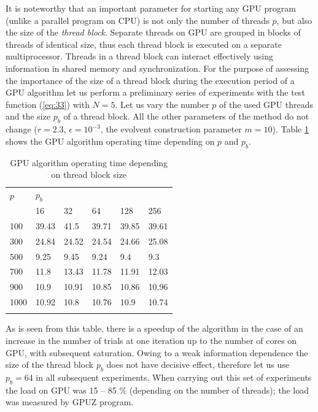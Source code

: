 \documentclass[smallcondensed]{svjour3}     %
\begin{document}
It is noteworthy that an important parameter for starting any GPU program (unlike a parallel program on CPU) is not only the number of threads $p$, but also the size of the \textit{thread block}. Separate threads on GPU are grouped in blocks of threads of identical size, thus each thread block is executed on a separate multiprocessor. Threads in a thread block can interact effectively using information in shared memory and synchronization. For the purpose of assessing the importance of the size of a thread block during the execution period of a GPU algorithm let us perform a preliminary series of experiments with the test function (\ref{eq:33}) with $N=5$. Let us vary the number $p$ of the used GPU threads and the size $p_b$ of a thread block. All the other parameters of the method do not change ($r=2.3$, $\epsilon = 10^{-3}$, the evolvent construction parameter $m=10$). Table \ref{tab:2} shows the GPU algorithm operating time depending on $p$ and $p_b$.
\begin{table}
	\caption{GPU algorithm operating time depending on thread block size}
	\label{tab:2}
	\center
	\begin{tabular}{llllll}
		\hline\noalign{\smallskip}
		$p$ & \multicolumn{5}{l}{ \hfil $p_b$ \hfil } \\
		\noalign{\smallskip} \cline{2-6} \noalign{\smallskip}
		 & 16 & 32 & 64 & 128 & 256  \\
		\noalign{\smallskip} \hline \noalign{\smallskip}
		100 &	39.43 &	41.5 &	39.71 &	39.85 &	39.61 \\
		300 &	24.84 &	24.52 &	24.54 &	24.66 &	25.08 \\
		500 &	9.25 &	9.45 &	9.24 &	9.4 &	9.3\\
		700 &	11.8 &	13.43 &	11.78 &	11.91 &	12.03\\
		900 &	10.9 &	10.91 &	10.85 &	10.86 &	10.96\\
		1000 &	10.92 &	10.8 &	10.76 &	10.9 &	10.74\\
		\noalign{\smallskip}\hline
	\end{tabular}
\end{table}

As is seen from this table, there is a speedup of the algorithm in the case of an increase in the number of trials at one iteration up to the number of cores on GPU, with subsequent saturation. Owing to a weak information dependence the size of the thread block $p_b$ does not have decisive effect, therefore let us use $p_b=64$ in all subsequent experiments. When carrying out this set of experiments the load on GPU was 15 -- 85 \% (depending on the number of threads); the load was measured by GPUZ program.
\end{document}
